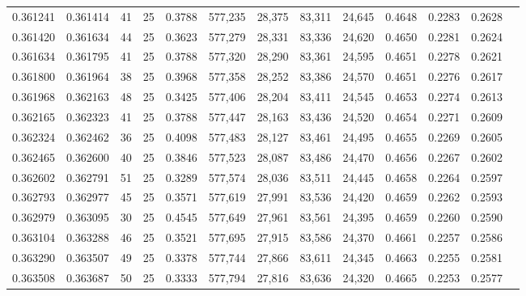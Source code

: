 \begin{tabular}{rrrrrrrrrrrrr}
0.361241 & 0.361414 &    41 &  25 &                                     0.3788 & 577,235 &  28,375 &  83,311 &  24,645 & 0.4648 & 0.2283 & 0.2628 \\
0.361420 & 0.361634 &    44 &  25 &                                     0.3623 & 577,279 &  28,331 &  83,336 &  24,620 & 0.4650 & 0.2281 & 0.2624 \\
0.361634 & 0.361795 &    41 &  25 &                                     0.3788 & 577,320 &  28,290 &  83,361 &  24,595 & 0.4651 & 0.2278 & 0.2621 \\
0.361800 & 0.361964 &    38 &  25 &                                     0.3968 & 577,358 &  28,252 &  83,386 &  24,570 & 0.4651 & 0.2276 & 0.2617 \\
0.361968 & 0.362163 &    48 &  25 &                                     0.3425 & 577,406 &  28,204 &  83,411 &  24,545 & 0.4653 & 0.2274 & 0.2613 \\
0.362165 & 0.362323 &    41 &  25 &                                     0.3788 & 577,447 &  28,163 &  83,436 &  24,520 & 0.4654 & 0.2271 & 0.2609 \\
0.362324 & 0.362462 &    36 &  25 &                                     0.4098 & 577,483 &  28,127 &  83,461 &  24,495 & 0.4655 & 0.2269 & 0.2605 \\
0.362465 & 0.362600 &    40 &  25 &                                     0.3846 & 577,523 &  28,087 &  83,486 &  24,470 & 0.4656 & 0.2267 & 0.2602 \\
0.362602 & 0.362791 &    51 &  25 &                                     0.3289 & 577,574 &  28,036 &  83,511 &  24,445 & 0.4658 & 0.2264 & 0.2597 \\
0.362793 & 0.362977 &    45 &  25 &                                     0.3571 & 577,619 &  27,991 &  83,536 &  24,420 & 0.4659 & 0.2262 & 0.2593 \\
0.362979 & 0.363095 &    30 &  25 &                                     0.4545 & 577,649 &  27,961 &  83,561 &  24,395 & 0.4659 & 0.2260 & 0.2590 \\
0.363104 & 0.363288 &    46 &  25 &                                     0.3521 & 577,695 &  27,915 &  83,586 &  24,370 & 0.4661 & 0.2257 & 0.2586 \\
0.363290 & 0.363507 &    49 &  25 &                                     0.3378 & 577,744 &  27,866 &  83,611 &  24,345 & 0.4663 & 0.2255 & 0.2581 \\
0.363508 & 0.363687 &    50 &  25 &                                     0.3333 & 577,794 &  27,816 &  83,636 &  24,320 & 0.4665 & 0.2253 & 0.2577 \\

\end{tabular}
